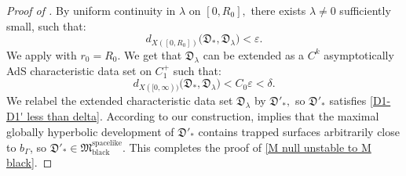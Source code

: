 \documentclass[11pt]{article}
\numberwithin{equation}{section}
\begin{document}
\begin{proof}[Proof of ]
    By uniform continuity in $\lambda$ on $[0,R_0],$ there exists $\lambda\neq0$ sufficiently small, such that:
    \begin{equation}\label{D-Dlamdba R0}
        d_{X([0,R_0])}\big(\mathfrak{D}_*,\mathfrak{D}_{\lambda}\big)<\varepsilon.
    \end{equation}
    We apply  with $r_0=R_0.$ We get that $\mathfrak{D}_{\lambda}$ can be extended as a $C^k$ asymptotically AdS characteristic data set on $C_1^+$ such that:
    \begin{equation}\label{D-Dlamdba}
        d_{X([0,\infty))}\big(\mathfrak{D}_*,\mathfrak{D}_{\lambda}\big)<C_0\varepsilon<\delta.
    \end{equation}
    We relabel the extended characteristic data set $\mathfrak{D}_{\lambda}$ by $\mathfrak{D}'_*,$ so $\mathfrak{D}'_*$ satisfies \eqref{D1-D1' less than delta}. According to our construction,  implies that the maximal globally hyperbolic development of $\mathfrak{D}'_*$ contains trapped surfaces arbitrarily close to $b_{\Gamma}$, so $\mathfrak{D}'_*\in\mathfrak{M}_{\mathrm{black}}^{\mathrm{spacelike}}.$ This completes the proof of \eqref{M null unstable to M black}.


\end{proof}
\end{document}

